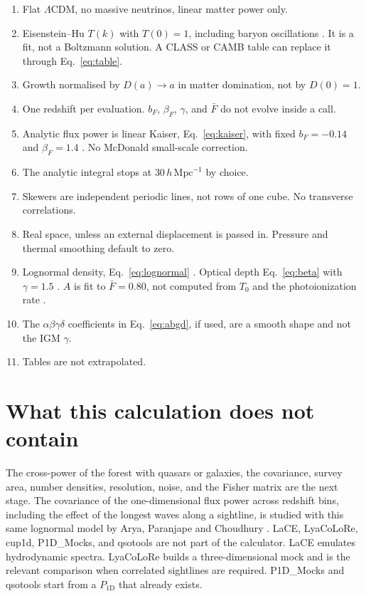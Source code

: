 \documentclass[11pt]{article}
\begin{document}
\begin{enumerate}
\item Flat $\Lambda$CDM, no massive neutrinos, linear matter power only.
\item Eisenstein--Hu $T(k)$ with $T(0)=1$, including baryon oscillations \cite{Eisenstein:1997ik}. It is a fit, not a Boltzmann solution. A CLASS or CAMB table can replace it through Eq.~\eqref{eq:table}.
\item Growth normalised by $D(a)\to a$ in matter domination, not by $D(0)=1$.
\item One redshift per evaluation. $b_F$, $\beta_F$, $\gamma$, and $\bar F$ do not evolve inside a call.
\item Analytic flux power is linear Kaiser, Eq.~\eqref{eq:kaiser}, with fixed $b_F=-0.14$ and $\beta_F=1.4$ \cite{Kaiser:1987qv,McDonald:2001fe,Gordon:2023dua}. No McDonald small-scale correction.
\item The analytic integral stops at $30\,h\,\mathrm{Mpc}^{-1}$ by choice.
\item Skewers are independent periodic lines, not rows of one cube. No transverse correlations.
\item Real space, unless an external displacement is passed in. Pressure and thermal smoothing default to zero.
\item Lognormal density, Eq.~\eqref{eq:lognormal} \cite{Bi:1996fh}. Optical depth Eq.~\eqref{eq:beta} with $\gamma=1.5$ \cite{Hui:1997dp,Kooistra:2022hzw}. $A$ is fit to $\bar F=0.80$, not computed from $T_0$ and the photoionization rate \cite{Arya:2022uke}.
\item The $\alpha\beta\gamma\delta$ coefficients in Eq.~\eqref{eq:abgd}, if used, are a smooth shape and not the IGM $\gamma$.
\item Tables are not extrapolated.
\end{enumerate}

\section{What this calculation does not contain}

The cross-power of the forest with quasars or galaxies, the covariance, survey area, number densities, resolution, noise, and the Fisher matrix are the next stage. The covariance of the one-dimensional flux power across redshift bins, including the effect of the longest waves along a sightline, is studied with this same lognormal model by Arya, Paranjape and Choudhury \cite{Arya:2023ipe}. LaCE, LyaCoLoRe, cup1d, P1D\_Mocks, and qsotools are not part of the calculator. LaCE emulates hydrodynamic spectra. LyaCoLoRe builds a three-dimensional mock and is the relevant comparison when correlated sightlines are required. P1D\_Mocks and qsotools start from a $P_{1\mathrm{D}}$ that already exists.



\end{document}
